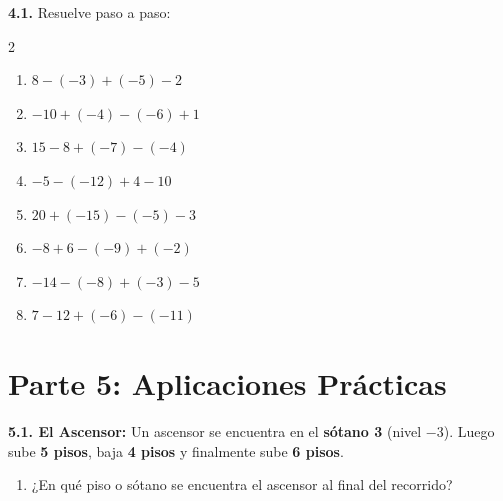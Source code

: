 \documentclass[11pt, letterpaper]{article}
\newif\ifshowanswers
\newcommand{\answer}[1]{
	\ifshowanswers
	\par\vspace{0.1cm}
	\begin{tcolorbox}[colback=blue!5!white, colframe=blue!60!white, arc=1mm, boxrule=0.5pt, title=\textbf{\footnotesize SOLUCIÓN PASO A PASO (DOCENTE)}]
		\color{blue!80!black}\footnotesize #1
	\end{tcolorbox}
	\par\vspace{0.1cm}
	\else
	\par\vspace{0.2cm}
	\fi
}
\begin{document}
	\noindent \textbf{4.1.} Resuelve paso a paso:
	\begin{multicols}{2}
		\begin{enumerate}[label=\alph*), itemsep=0.8cm]
			\item $8 - (-3) + (-5) - 2$
			\item $-10 + (-4) - (-6) + 1$
			\item $15 - 8 + (-7) - (-4)$
			\item $-5 - (-12) + 4 - 10$
			\item $20 + (-15) - (-5) - 3$
			\item $-8 + 6 - (-9) + (-2)$
			\item $-14 - (-8) + (-3) - 5$
			\item $7 - 12 + (-6) - (-11)$
		\end{enumerate}
	\end{multicols}
	
	\answer{
		a) $8 + 3 - 5 - 2 = 11 - 5 - 2 = \mathbf{4}$\\
		b) $-10 - 4 + 6 + 1 = -14 + 7 = \mathbf{-7}$\\
		c) $15 - 8 - 7 + 4 = 7 - 7 + 4 = \mathbf{4}$\\
		d) $-5 + 12 + 4 - 10 = 7 + 4 - 10 = \mathbf{1}$\\
		e) $20 - 15 + 5 - 3 = 5 + 5 - 3 = \mathbf{7}$\\
		f) $-8 + 6 + 9 - 2 = -2 + 9 - 2 = \mathbf{5}$\\
		g) $-14 + 8 - 3 - 5 = -6 - 3 - 5 = \mathbf{-14}$\\
		h) $7 - 12 - 6 + 11 = -5 - 6 + 11 = \mathbf{0}$
	}
	
	\vspace{0.2cm}
	
	\section*{\color{valblue} Parte 5: Aplicaciones Prácticas}
	
	\noindent \textbf{5.1. El Ascensor:} Un ascensor se encuentra en el \textbf{sótano 3} (nivel $-3$). Luego sube \textbf{5 pisos}, baja \textbf{4 pisos} y finalmente sube \textbf{6 pisos}.
	\begin{enumerate}[label=\alph*), itemsep=0cm]
		\item ¿En qué piso o sótano se encuentra el ascensor al final del recorrido?
	\end{enumerate}
	
\end{document}
